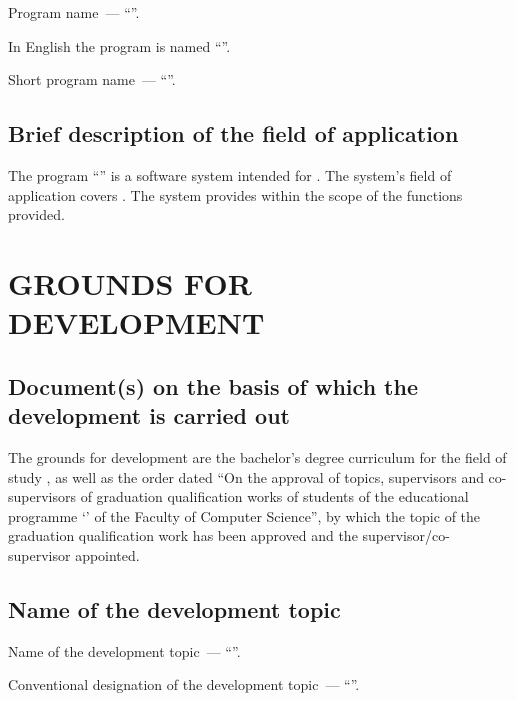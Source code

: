 \documentclass[12pt,a4paper]{extarticle}
\begin{document}
Program name~--- \enquote{\projectname}.

In English the program is named \enquote{\hseProjectNameEn}.

Short program name~--- \enquote{\hseProjectNameShort}.

\subsection{Brief description of the field of application}

The program \enquote{\projectname} is a software system intended for . The system's field of application covers . The system provides  within the scope of the functions provided.

\clearpage

\section{GROUNDS FOR DEVELOPMENT}

\subsection{Document(s) on the basis of which the development is carried out}

The grounds for development are the bachelor's degree curriculum for the field of study , as well as the order dated  \enquote{On the approval of topics, supervisors and co-supervisors of graduation qualification works of students of the educational programme \enquote{\hseSpecialization} of the Faculty of Computer Science}, by which the topic of the graduation qualification work has been approved and the supervisor/co-supervisor appointed.

\subsection{Name of the development topic}

Name of the development topic~--- \enquote{\projectname}.

Conventional designation of the development topic~--- \enquote{}.
\end{document}
